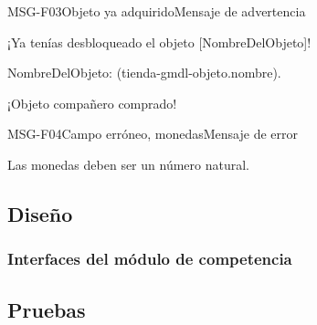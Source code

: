     \begin{mensaje2}{MSG-F03}{Objeto ya adquirido}{Mensaje de advertencia}
        \item[Redacción:] ¡Ya tenías desbloqueado el objeto [NombreDelObjeto]!
        \item[Parámetros:]
        \begin{Citemize}
            \item NombreDelObjeto: (tienda-gmdl-objeto.nombre).
        \end{Citemize}
       \item[Ejemplo:] ¡Objeto compañero comprado!
    \end{mensaje2}

    \begin{mensaje2}{MSG-F04}{Campo erróneo, monedas}{Mensaje de error}
        \item[Redacción:] Las monedas deben ser un número natural.
    \end{mensaje2}





\clearpage
\subsection{Diseño}

\subsubsection{Interfaces del módulo de competencia}



%

\subsection{Pruebas}


